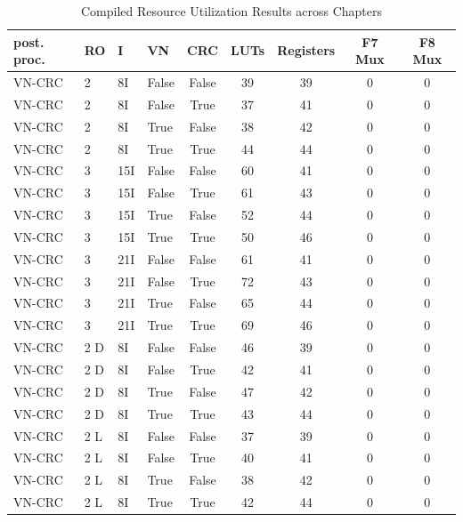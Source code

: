 \begin{table}[H]
  \centering
  \caption{Compiled Resource Utilization Results across Chapters}
  \label{tab:resource_utilization}
\begin{tabular}{llllccccc} 
    \hline
    \textbf{post. proc.} & \textbf{RO} & \textbf{I} & \textbf{VN} & \textbf{CRC} & \textbf{LUTs} & \textbf{Registers} & \textbf{F7 Mux} & \textbf{F8 Mux} \\
    \hline
    VN-CRC   & 2 & 8I    & False & False & 39    & 39   & 0   & 0 \\
    VN-CRC   & 2 & 8I    & False & True  & 37    & 41   & 0   & 0 \\
    VN-CRC   & 2 & 8I    & True  & False & 38    & 42   & 0   & 0 \\
    VN-CRC   & 2 & 8I    & True  & True  & 44    & 44   & 0   & 0 \\
    VN-CRC   & 3 & 15I   & False & False & 60    & 41   & 0   & 0 \\
    VN-CRC   & 3 & 15I   & False & True  & 61    & 43   & 0   & 0 \\
    VN-CRC   & 3 & 15I   & True  & False & 52    & 44   & 0   & 0 \\
    VN-CRC   & 3 & 15I   & True  & True  & 50    & 46   & 0   & 0 \\
    VN-CRC   & 3 & 21I   & False & False & 61    & 41   & 0   & 0 \\
    VN-CRC   & 3 & 21I   & False & True  & 72    & 43   & 0   & 0 \\
    VN-CRC   & 3 & 21I   & True  & False & 65    & 44   & 0   & 0 \\
    VN-CRC   & 3 & 21I   & True  & True  & 69    & 46   & 0   & 0 \\
    VN-CRC   & 2 D & 8I   & False & False & 46    & 39   & 0   & 0 \\
    VN-CRC   & 2 D & 8I   & False & True  & 42    & 41   & 0   & 0 \\
    VN-CRC   & 2 D & 8I   & True  & False & 47    & 42   & 0   & 0 \\
    VN-CRC   & 2 D & 8I   & True  & True  & 43    & 44   & 0   & 0 \\
    VN-CRC   & 2 L & 8I   & False & False & 37    & 39   & 0   & 0 \\
    VN-CRC   & 2 L & 8I   & False & True  & 40    & 41   & 0   & 0 \\
    VN-CRC   & 2 L & 8I   & True  & False & 38    & 42   & 0   & 0 \\
    VN-CRC   & 2 L & 8I   & True  & True  & 42    & 44   & 0   & 0 \\

\end{tabular}
\end{table}
